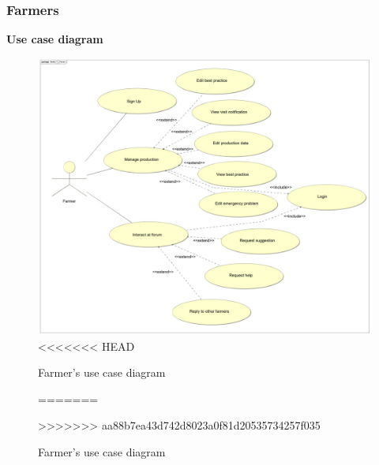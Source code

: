 \subsubsection{Farmers}
\textbf{\textcolor{myblue}{Use case diagram}}
\begin{figure}[H]
	\centering
    \includegraphics[page=1, width=\textwidth]{Images/ud_fa.JPG}
<<<<<<< HEAD
	\caption{\label{fig:f_use_case_diagram}Farmer's use case diagram}
=======
	\caption{\label{fig:use_case_diagram}Farmer's use case diagram}
>>>>>>> aa88b7ea43d742d8023a0f81d20535734257f035
\end{figure}
\label{sect:farmer_requirements}



